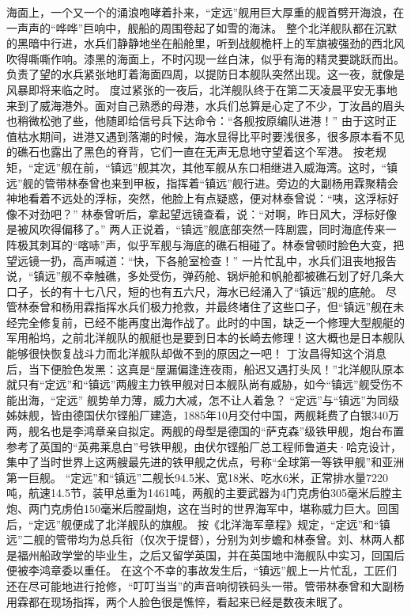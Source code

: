 \documentclass[12pt,UTF8]{ctexbook}
\begin{document}
海面上，一个又一个的涌浪咆哮着扑来，“定远”舰用巨大厚重的舰首劈开海浪，在一声声的“哗哗”巨响中，舰船的周围卷起了如雪的海沫。
整个北洋舰队都在沉默的黑暗中行进，水兵们静静地坐在船舱里，听到战舰桅杆上的军旗被强劲的西北风吹得嘶嘶作响。漆黑的海面上，不时闪现一丝白沫，似乎有海的精灵要跳跃而出。负责了望的水兵紧张地盯着海面四周，以提防日本舰队突然出现。这一夜，就像是风暴即将来临之时。
度过紧张的一夜后，北洋舰队终于在第二天凌晨平安无事地来到了威海港外。面对自己熟悉的母港，水兵们总算是心定了不少，丁汝昌的眉头也稍微松弛了些，他随即给信号兵下达命令：“各舰按原编队进港！”
由于这时正值枯水期间，进港又遇到落潮的时候，海水显得比平时要浅很多，很多原本看不见的礁石也露出了黑色的脊背，它们一直在无声无息地守望着这个军港。
按老规矩，“定远”舰在前，“镇远”舰其次，其他军舰从东口相继进入威海湾。这时，“镇远”舰的管带林泰曾也来到甲板，指挥着“镇远”舰行进。旁边的大副杨用霖聚精会神地看着不远处的浮标，突然，他脸上有点疑惑，便对林泰曾说：“咦，这浮标好像不对劲吧？”
林泰曾听后，拿起望远镜查看，说：“对啊，昨日风大，浮标好像是被风吹得偏移了。”
两人正说着，“镇远”舰底部突然一阵剧震，同时海底传来一阵极其刺耳的“喀哧”声，似乎军舰与海底的礁石相碰了。林泰曾顿时脸色大变，把望远镜一扔，高声喊道：“快，下各舱室检查！”
一片忙乱中，水兵们沮丧地报告说，“镇远”舰不幸触礁，多处受伤，弹药舱、锅炉舱和帆舱都被礁石划了好几条大口子，长的有十七八尺，短的也有五六尺，海水已经涌入了“镇远”舰的底舱。
尽管林泰曾和杨用霖指挥水兵们极力抢救，并最终堵住了这些口子，但“镇远”舰在未经完全修复前，已经不能再度出海作战了。此时的中国，缺乏一个修理大型舰艇的军用船坞，之前北洋舰队的舰艇也是要到日本的长崎去修理！这大概也是日本舰队能够很快恢复战斗力而北洋舰队却做不到的原因之一吧！
丁汝昌得知这个消息后，当下便脸色发黑：这真是“屋漏偏逢连夜雨，船迟又遇打头风！”北洋舰队原本就只有“定远”和“镇远”两艘主力铁甲舰对日本舰队尚有威胁，如今“镇远”舰受伤不能出海，“定远”
舰势单力薄，威力大减，怎不让人着急？
“定远”与“镇远”为同级姊妹舰，皆由德国伏尔铿船厂建造，1885年10月交付中国，两舰耗费了白银340万两，舰名也是李鸿章亲自拟定。两舰的母型是德国的“萨克森”级铁甲舰，炮台布置参考了英国的“英弗莱息白”号铁甲舰，由伏尔铿船厂总工程师鲁道夫·哈克设计，集中了当时世界上这两艘最先进的铁甲舰之优点，号称“全球第一等铁甲舰”和亚洲第一巨舰。
“定远”和“镇远”二舰长94.5米、宽18米、吃水6米，正常排水量7220吨，航速14.5节，装甲总重为1461吨，两舰的主要武器为4门克虏伯305毫米后膛主炮、两门克虏伯150毫米后膛副炮，这在当时的世界海军中，堪称威力巨大。回国后，“定远”舰便成了北洋舰队的旗舰。
按《北洋海军章程》规定，“定远”和“镇远”二舰的管带均为总兵衔（仅次于提督），分别为刘步蟾和林泰曾。刘、林两人都是福州船政学堂的毕业生，之后又留学英国，并在英国地中海舰队中实习，回国后便被李鸿章委以重任。
在这个不幸的事故发生后，“镇远”舰上一片忙乱，工匠们还在尽可能地进行抢修，“叮叮当当”的声音响彻铁码头一带。管带林泰曾和大副杨用霖都在现场指挥，两个人脸色很是憔悴，看起来已经是数夜未眠了。
\end{document}
